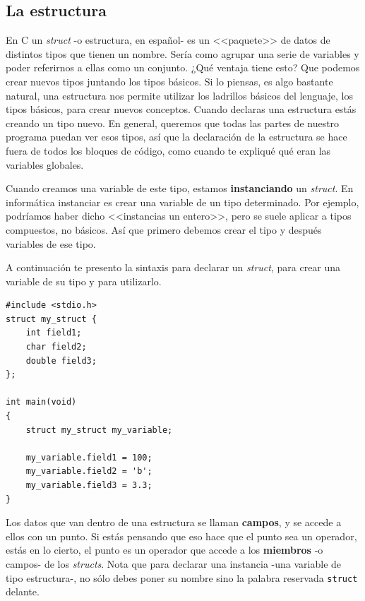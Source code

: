 \documentclass[a4paper]{article}
\begin{document}
\subsection{La estructura}
En C un \textit{struct} -o estructura, en español-
es un <<paquete>> de datos de distintos tipos que
tienen un nombre. Sería como agrupar una serie de variables y poder referirnos
a ellas como un conjunto. ¿Qué ventaja tiene esto? Que podemos crear nuevos
tipos juntando los tipos básicos. Si lo piensas, es algo bastante natural, una
estructura nos permite utilizar los ladrillos básicos del lenguaje, los
tipos básicos, para crear nuevos conceptos.
Cuando declaras una estructura estás creando un tipo
nuevo. En general,
queremos que todas las partes de nuestro programa puedan ver esos tipos, así
que la declaración de la estructura se hace fuera de todos los bloques
de código, como cuando te expliqué qué eran las variables globales.

Cuando creamos una variable de este tipo, estamos \textbf{instanciando} un
\textit{struct}. En informática instanciar es crear una variable de un tipo
determinado. Por ejemplo, podríamos haber dicho <<instancias un entero>>, pero
se suele aplicar a tipos compuestos, no básicos. Así que primero debemos crear
el tipo y después variables de ese tipo.


A continuación
te presento la sintaxis para declarar un \textit{struct}, para crear una
variable de su tipo y para utilizarlo.


\noindent
\begin{minipage}[H]{\linewidth}
\mbox{}
\begin{lstlisting}[style=C,
caption={Declaración, instanciación y uso de un \textit{struct}},
label={lst:structUse}]
#include <stdio.h>
struct my_struct {
    int field1;
    char field2;
    double field3;
};

int main(void)
{
    struct my_struct my_variable;

    my_variable.field1 = 100;
    my_variable.field2 = 'b';
    my_variable.field3 = 3.3;
}
\end{lstlisting}
\end{minipage}


Los datos que van dentro de una estructura se llaman \textbf{campos}, y
se accede a ellos con un punto. Si estás pensando que eso hace que el punto
sea un operador, estás en lo cierto, el punto es un operador que accede a los
\textbf{miembros} -o campos- de los \textit{structs}. Nota que para declarar
una instancia -una variable de tipo estructura-, no sólo debes poner su nombre
sino la palabra reservada
\lstinline[style=C]{struct} delante.
\end{document}
